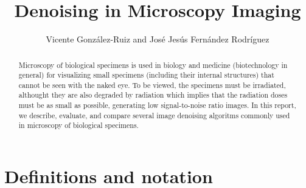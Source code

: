 \documentclass{article}
\title{Denoising in Microscopy Imaging}
\author{Vicente González-Ruiz and José Jesús Fernández Rodríguez}
\begin{document}
\maketitle

\begin{abstract}

  Microscopy of biological specimens is used in biology and medicine
  (biotechnology in general) for visualizing small specimens
  (including their internal structures) that cannot be seen with the
  naked eye. To be viewed, the specimens must be irradiated, althought
  they are also degraded by radiation which implies that the radiation
  doses must be as small as possible, generating low signal-to-noise
  ratio images. In this report, we describe, evaluate, and
  compare several image denoising algoritms commonly used in microscopy
  of biological specimens. 

\end{abstract}

\tableofcontents

\section*{Definitions and notation}
\end{document}
